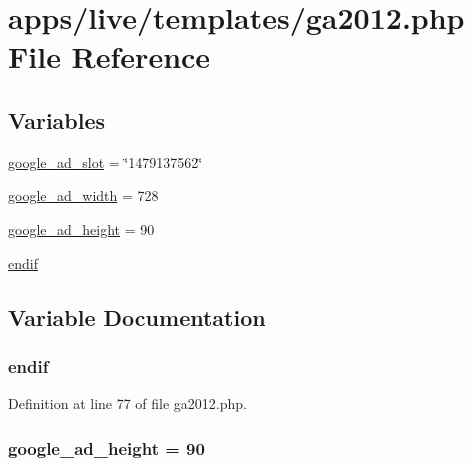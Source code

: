 \hypertarget{ga2012_8php}{\section{apps/live/templates/ga2012.php File Reference}
\label{ga2012_8php}
}
\subsection*{Variables}
\begin{DoxyCompactItemize}
\item 
\hyperlink{ga2012_8php_aa79c0b4edf93d8b30e366517f0be9a76}{google\-\_\-ad\-\_\-slot} = \char`\"{}1479137562\char`\"{}
\item 
\hyperlink{ga2012_8php_a0306e559cf8f0ad70404137191e0dbf1}{google\-\_\-ad\-\_\-width} = 728
\item 
\hyperlink{ga2012_8php_a235bac25214f7793ee05fcf36a098866}{google\-\_\-ad\-\_\-height} = 90
\item 
\hyperlink{ga2012_8php_a82cd33ca97ff99f2fcc5e9c81d65251b}{endif}
\end{DoxyCompactItemize}


\subsection{Variable Documentation}
\hypertarget{ga2012_8php_a82cd33ca97ff99f2fcc5e9c81d65251b}{
\subsubsection[{endif}]{\setlength{\rightskip}{0pt plus 5cm}endif}}\label{ga2012_8php_a82cd33ca97ff99f2fcc5e9c81d65251b}


Definition at line 77 of file ga2012.\-php.

\hypertarget{ga2012_8php_a235bac25214f7793ee05fcf36a098866}{
\subsubsection[{google\-\_\-ad\-\_\-height}]{\setlength{\rightskip}{0pt plus 5cm}google\-\_\-ad\-\_\-height = 90}}\label{ga2012_8php_a235bac25214f7793ee05fcf36a098866}


